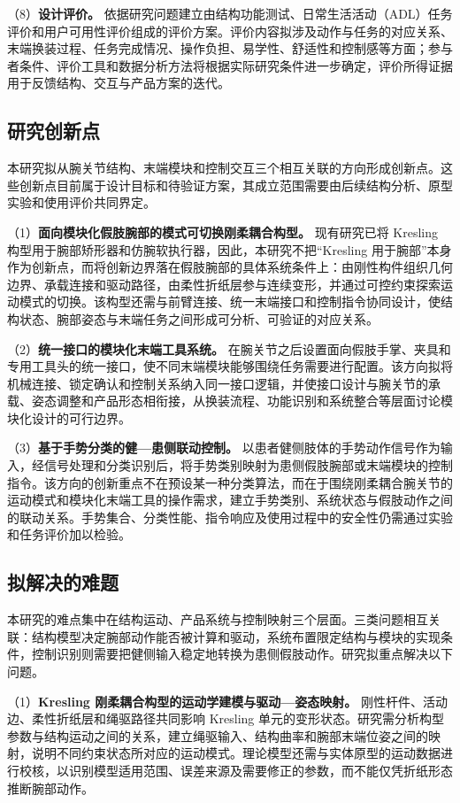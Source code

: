 （8）\textbf{设计评价。} 依据研究问题建立由结构功能测试、日常生活活动（ADL）任务评价和用户可用性评价组成的评价方案。评价内容拟涉及动作与任务的对应关系、末端换装过程、任务完成情况、操作负担、易学性、舒适性和控制感等方面；参与者条件、评价工具和数据分析方法将根据实际研究条件进一步确定，评价所得证据用于反馈结构、交互与产品方案的迭代。

\subsection{研究创新点}

本研究拟从腕关节结构、末端模块和控制交互三个相互关联的方向形成创新点。这些创新点目前属于设计目标和待验证方案，其成立范围需要由后续结构分析、原型实验和使用评价共同界定。

（1）\textbf{面向模块化假肢腕部的模式可切换刚柔耦合构型。} 现有研究已将 Kresling 构型用于腕部矫形器和仿腕软执行器，因此，本研究不把“Kresling 用于腕部”本身作为创新点，而将创新边界落在假肢腕部的具体系统条件上：由刚性构件组织几何边界、承载连接和驱动路径，由柔性折纸层参与连续变形，并通过可控约束探索运动模式的切换。该构型还需与前臂连接、统一末端接口和控制指令协同设计，使结构状态、腕部姿态与末端任务之间形成可分析、可验证的对应关系。

（2）\textbf{统一接口的模块化末端工具系统。} 在腕关节之后设置面向假肢手掌、夹具和专用工具头的统一接口，使不同末端模块能够围绕任务需要进行配置。该方向拟将机械连接、锁定确认和控制关系纳入同一接口逻辑，并使接口设计与腕关节的承载、姿态调整和产品形态相衔接，从换装流程、功能识别和系统整合等层面讨论模块化设计的可行边界。

（3）\textbf{基于手势分类的健—患侧联动控制。} 以患者健侧肢体的手势动作信号作为输入，经信号处理和分类识别后，将手势类别映射为患侧假肢腕部或末端模块的控制指令。该方向的创新重点不在预设某一种分类算法，而在于围绕刚柔耦合腕关节的运动模式和模块化末端工具的操作需求，建立手势类别、系统状态与假肢动作之间的联动关系。手势集合、分类性能、指令响应及使用过程中的安全性仍需通过实验和任务评价加以检验。

\subsection{拟解决的难题}

本研究的难点集中在结构运动、产品系统与控制映射三个层面。三类问题相互关联：结构模型决定腕部动作能否被计算和驱动，系统布置限定结构与模块的实现条件，控制识别则需要把健侧输入稳定地转换为患侧假肢动作。研究拟重点解决以下问题。

（1）\textbf{Kresling 刚柔耦合构型的运动学建模与驱动—姿态映射。} 刚性杆件、活动边、柔性折纸层和绳驱路径共同影响 Kresling 单元的变形状态。研究需分析构型参数与结构运动之间的关系，建立绳驱输入、结构曲率和腕部末端位姿之间的映射，说明不同约束状态所对应的运动模式。理论模型还需与实体原型的运动数据进行校核，以识别模型适用范围、误差来源及需要修正的参数，而不能仅凭折纸形态推断腕部动作。

